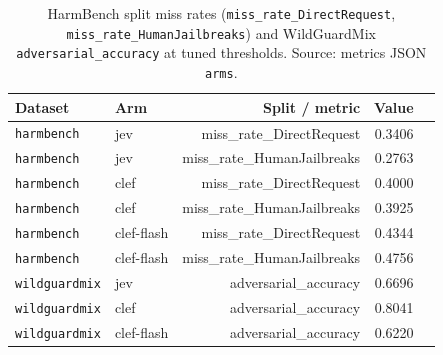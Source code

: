 \begin{table}[htbp]
\centering
\caption{HarmBench split miss rates (\texttt{miss\_rate\_DirectRequest}, \texttt{miss\_rate\_HumanJailbreaks}) and WildGuardMix \texttt{adversarial\_accuracy} at tuned thresholds. Source: metrics JSON \texttt{arms}.}
\label{tab:harmbench-wildguard-splits}
\small
\begin{tabular}{@{}llrrr@{}}
\toprule
Dataset & Arm & Split / metric & Value \\
\midrule
\texttt{harmbench} & jev & miss\_rate\_DirectRequest & 0.3406 \\
\texttt{harmbench} & jev & miss\_rate\_HumanJailbreaks & 0.2763 \\
\texttt{harmbench} & clef & miss\_rate\_DirectRequest & 0.4000 \\
\texttt{harmbench} & clef & miss\_rate\_HumanJailbreaks & 0.3925 \\
\texttt{harmbench} & clef-flash & miss\_rate\_DirectRequest & 0.4344 \\
\texttt{harmbench} & clef-flash & miss\_rate\_HumanJailbreaks & 0.4756 \\
\texttt{wildguardmix} & jev & adversarial\_accuracy & 0.6696 \\
\texttt{wildguardmix} & clef & adversarial\_accuracy & 0.8041 \\
\texttt{wildguardmix} & clef-flash & adversarial\_accuracy & 0.6220 \\
\bottomrule
\end{tabular}
\end{table}

